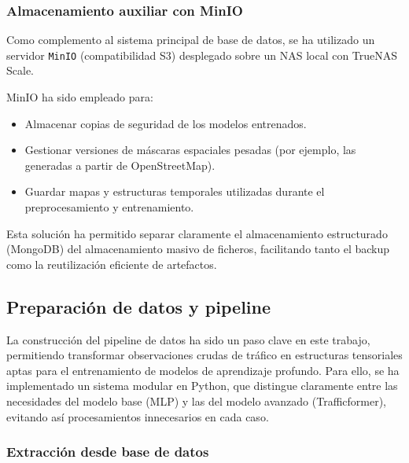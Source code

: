 \subsubsection{Almacenamiento auxiliar con MinIO}

Como complemento al sistema principal de base de datos, se ha utilizado un servidor \texttt{MinIO} (compatibilidad S3) desplegado sobre un NAS local con TrueNAS Scale.

MinIO ha sido empleado para:

\begin{itemize}
	\item Almacenar copias de seguridad de los modelos entrenados.
	\item Gestionar versiones de máscaras espaciales pesadas (por ejemplo, las generadas a partir de OpenStreetMap).
	\item Guardar mapas y estructuras temporales utilizadas durante el preprocesamiento y entrenamiento.
\end{itemize}

Esta solución ha permitido separar claramente el almacenamiento estructurado (MongoDB) del almacenamiento masivo de ficheros, facilitando tanto el backup como la reutilización eficiente de artefactos.


\subsection{Preparación de datos y pipeline}
\label{sec:prep_datos_pipeline}

La construcción del pipeline de datos ha sido un paso clave en este trabajo, permitiendo transformar observaciones crudas de tráfico en estructuras tensoriales aptas para el entrenamiento de modelos de aprendizaje profundo. Para ello, se ha implementado un sistema modular en Python, que distingue claramente entre las necesidades del modelo base (MLP) y las del modelo avanzado (Trafficformer), evitando así procesamientos innecesarios en cada caso.

\subsubsection{Extracción desde base de datos}

